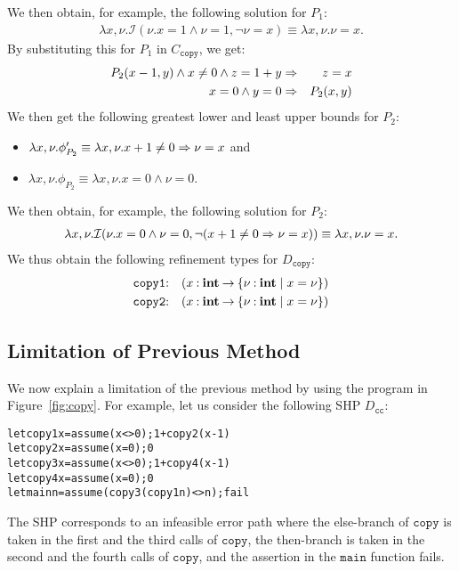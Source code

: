 We then obtain, for example, the following solution for \(P_1\):
\begin{eqnarray*}
\lambda x,\nu.\mathcal{I}(\nu.x=1 \land \nu=1,\neg \nu=x) \equiv \lambda x,\nu.\nu=x.
\end{eqnarray*}
By substituting this for \(P_1\) in \(C_{\texttt{copy}}\), we get:
\begin{eqnarray*}
P_2(x-1,y) \land x\neq0 \land z=1+y &\Rightarrow& z=x \\
x=0 \land y=0 &\Rightarrow& P_2(x,y)
\end{eqnarray*}
We then get the following greatest lower and least upper bounds for 
\(P_2\):
\begin{itemize}
\item \(\lambda x,\nu. \phi_{P_2}' \equiv \lambda x,\nu. x+1\neq0 \Rightarrow \nu=x\) and
\item \(\lambda x,\nu.\phi_{P_2} \equiv \lambda x,\nu.x=0 \land \nu=0\).
\end{itemize}
We then obtain, for example, the following solution for \(P_2\):
\begin{eqnarray*}
\lambda x,\nu.\mathcal{I}(\nu.x=0 \land \nu=0,\neg (x+1\neq0 \Rightarrow \nu=x)) \equiv \lambda x,\nu.\nu=x.
\end{eqnarray*}
We thus obtain the following refinement types for \(D_{\texttt{copy}}\):
\begin{eqnarray*}
\texttt{copy1}&\mathbin{:}&(x\mathbin{:}{\mathbf{int}}\mathbin{\rightarrow}{\{{\nu\mathbin{:}\mathbf{int} \mid x=\nu}\}}) \\
\texttt{copy2}&\mathbin{:}&(x\mathbin{:}{\mathbf{int}}\mathbin{\rightarrow}{\{{\nu\mathbin{:}\mathbf{int} \mid x=\nu}\}})
\end{eqnarray*}

\subsection{Limitation of Previous Method}
\label{sec:limit}

We now explain a limitation of the previous method by using the program 
in Figure~\ref{fig:copy}.  For example, let us consider the following 
SHP \(D_{\texttt{cc}}\):
\begin{alltt}
let copy1 x = assume (x<>0); 1 + copy2 (x-1)
let copy2 x = assume (x=0); 0
let copy3 x = assume (x<>0); 1 + copy4 (x-1)
let copy4 x = assume (x=0); 0
let main n = assume (copy3 (copy1 n) <> n); fail
\end{alltt}
The SHP corresponds to an infeasible error path where the else-branch of 
\(\texttt{copy}\) is taken in the first and the third calls of 
\(\texttt{copy}\), the then-branch is taken in the second and the fourth 
calls of \(\texttt{copy}\), and the assertion in the \(\texttt{main}\) 
function fails.

